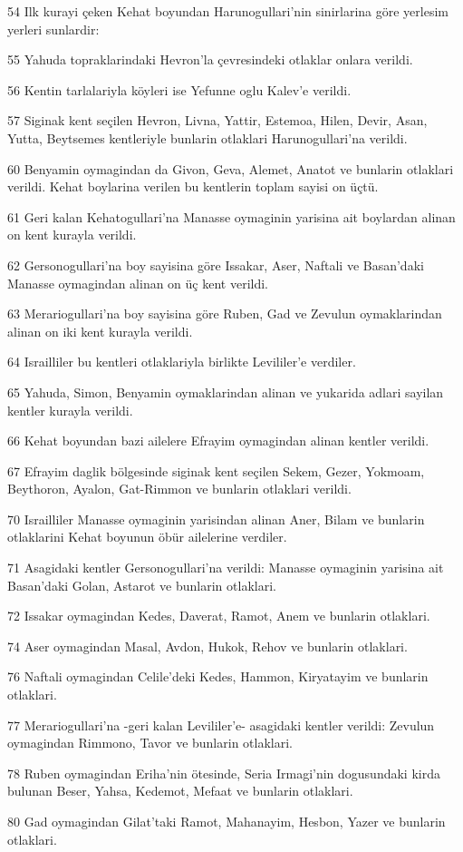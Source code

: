 \par 54 Ilk kurayi çeken Kehat boyundan Harunogullari'nin sinirlarina göre yerlesim yerleri sunlardir:
\par 55 Yahuda topraklarindaki Hevron'la çevresindeki otlaklar onlara verildi.
\par 56 Kentin tarlalariyla köyleri ise Yefunne oglu Kalev'e verildi.
\par 57 Siginak kent seçilen Hevron, Livna, Yattir, Estemoa, Hilen, Devir, Asan, Yutta, Beytsemes kentleriyle bunlarin otlaklari Harunogullari'na verildi.
\par 60 Benyamin oymagindan da Givon, Geva, Alemet, Anatot ve bunlarin otlaklari verildi. Kehat boylarina verilen bu kentlerin toplam sayisi on üçtü.
\par 61 Geri kalan Kehatogullari'na Manasse oymaginin yarisina ait boylardan alinan on kent kurayla verildi.
\par 62 Gersonogullari'na boy sayisina göre Issakar, Aser, Naftali ve Basan'daki Manasse oymagindan alinan on üç kent verildi.
\par 63 Merariogullari'na boy sayisina göre Ruben, Gad ve Zevulun oymaklarindan alinan on iki kent kurayla verildi.
\par 64 Israilliler bu kentleri otlaklariyla birlikte Levililer'e verdiler.
\par 65 Yahuda, Simon, Benyamin oymaklarindan alinan ve yukarida adlari sayilan kentler kurayla verildi.
\par 66 Kehat boyundan bazi ailelere Efrayim oymagindan alinan kentler verildi.
\par 67 Efrayim daglik bölgesinde siginak kent seçilen Sekem, Gezer, Yokmoam, Beythoron, Ayalon, Gat-Rimmon ve bunlarin otlaklari verildi.
\par 70 Israilliler Manasse oymaginin yarisindan alinan Aner, Bilam ve bunlarin otlaklarini Kehat boyunun öbür ailelerine verdiler.
\par 71 Asagidaki kentler Gersonogullari'na verildi: Manasse oymaginin yarisina ait Basan'daki Golan, Astarot ve bunlarin otlaklari.
\par 72 Issakar oymagindan Kedes, Daverat, Ramot, Anem ve bunlarin otlaklari.
\par 74 Aser oymagindan Masal, Avdon, Hukok, Rehov ve bunlarin otlaklari.
\par 76 Naftali oymagindan Celile'deki Kedes, Hammon, Kiryatayim ve bunlarin otlaklari.
\par 77 Merariogullari'na -geri kalan Levililer'e- asagidaki kentler verildi: Zevulun oymagindan Rimmono, Tavor ve bunlarin otlaklari.
\par 78 Ruben oymagindan Eriha'nin ötesinde, Seria Irmagi'nin dogusundaki kirda bulunan Beser, Yahsa, Kedemot, Mefaat ve bunlarin otlaklari.
\par 80 Gad oymagindan Gilat'taki Ramot, Mahanayim, Hesbon, Yazer ve bunlarin otlaklari.

